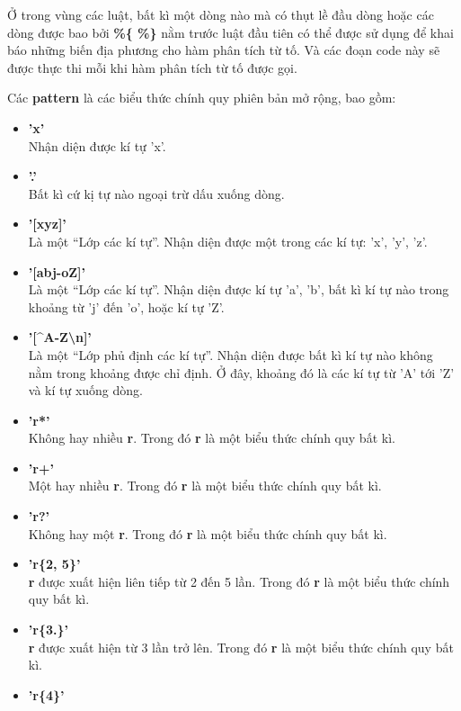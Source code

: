 \documentclass[../report.tex]{subfiles}
\begin{document}
Ở trong vùng các luật, bất kì một dòng nào mà có thụt lề đầu dòng
hoặc các dòng được bao bởi \textbf{\%\{ \%\}} nằm trước luật đầu tiên 
có thể được sử dụng để khai báo những biến địa phương cho 
hàm phân tích từ tố. Và các đoạn code này sẽ được thực thi mỗi 
khi hàm phân tích từ tố được gọi. 

Các \textbf{pattern} là các biểu thức chính quy phiên bản mở rộng, bao gồm:
\begin{itemize}
\item \textbf{'x'} \\
    Nhận diện được kí tự 'x'.
\item \textbf{'.'} \\
    Bất kì cứ kị tự nào ngoại trừ dấu xuống dòng. 
\item \textbf{'[xyz]'} \\
    Là một ``Lớp các kí tự''. Nhận diện được một trong các kí tự: 'x', 'y', 'z'.
\item \textbf{'[abj-oZ]'} \\
    Là một ``Lớp các kí tự''. Nhận diện được kí tự 'a', 'b', bất kì kí tự nào 
    trong khoảng từ 'j' đến 'o', hoặc kí tự 'Z'.
\item \textbf{'[\textasciicircum A-Z\textbackslash n]'} \\
    Là một ``Lớp phủ định các kí tự''. Nhận diện được bất kì kí tự nào không nằm trong khoảng 
    được chỉ định. Ở đây, khoảng đó là các kí tự từ 'A' tới 'Z' và kí tự xuống dòng. 
\item \textbf{'r*'} \\
    Không hay nhiều \textbf{r}. Trong đó \textbf{r} là một biểu thức chính quy bất kì. 
\item \textbf{'r+'} \\
    Một hay nhiều \textbf{r}. Trong đó \textbf{r} là một biểu thức chính quy bất kì. 
\item \textbf{'r?'} \\
    Không hay một \textbf{r}. Trong đó \textbf{r} là một biểu thức chính quy bất kì. 
\item \textbf{'r\{2, 5\}'} \\
    \textbf{r} được xuất hiện liên tiếp từ 2 đến 5 lần. Trong đó \textbf{r} là một biểu thức chính quy bất kì. 
\item \textbf{'r\{3.\}'} \\
    \textbf{r} được xuất hiện từ 3 lần trở lên. Trong đó \textbf{r} là một biểu thức chính quy bất kì. 
\item \textbf{'r\{4\}'} \\

\end{itemize}
\end{document}
